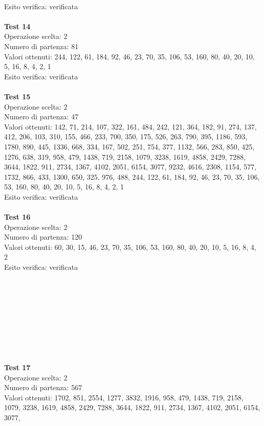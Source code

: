 \documentclass[10pt]{report}
\begin{document}
\\Esito verifica: verificata
\\
\\\textbf{Test 14} 
\\Operazione scelta: 2
\\Numero di partenza: 81
\\Valori ottenuti: 244, 122, 61, 184, 92, 46, 23, 70, 35, 106, 53, 160, 80, 40, 20, 10, 5, 16, 8, 4, 2, 1
\\Esito verifica: verificata
\\
\\\textbf{Test 15} 
\\Operazione scelta: 2
\\Numero di partenza: 47 
\\Valori ottenuti: 142, 71, 214, 107, 322, 161, 484, 242, 121, 364, 182, 91, 274, 137, 412, 206, 103, 310, 155, 466, 233, 700, 350, 175, 526, 263, 790, 395, 1186, 593, 
1780, 890, 445, 1336, 668, 334, 167, 502, 251, 754, 377, 1132, 566, 283, 850, 425, 1276, 638, 319, 958, 479, 1438, 719, 2158, 1079, 3238, 1619, 4858, 2429, 7288, 3644, 1822, 
911, 2734, 1367, 4102, 2051, 6154, 3077, 9232, 4616, 2308, 1154, 577, 1732, 866, 433, 1300, 650, 325, 976, 488, 244, 122, 61, 184, 92, 46, 23, 70, 35, 106, 53, 160, 80, 40, 20, 
10, 5, 16, 8, 4, 2, 1
\\Esito verifica: verificata
\\
\\\textbf{Test 16} 
\\Operazione scelta: 2
\\Numero di partenza: 120
\\Valori ottenuti: 60, 30, 15, 46, 23, 70, 35, 106, 53, 160, 80, 40, 20, 10, 5, 16, 8, 4, 2
\\Esito verifica: verificata
\\
\\
\\
\\
\\
\\
\\
\\
\\
\\
\textbf{Test 17} 
\\Operazione scelta: 2
\\Numero di partenza: 567
\\Valori ottenuti: 1702, 851, 2554, 1277, 3832, 1916, 958, 479, 1438, 719, 2158, 1079, 3238, 1619, 4858, 2429, 7288, 3644, 1822, 911, 2734, 1367, 4102, 2051, 6154, 3077, 
\end{document}
